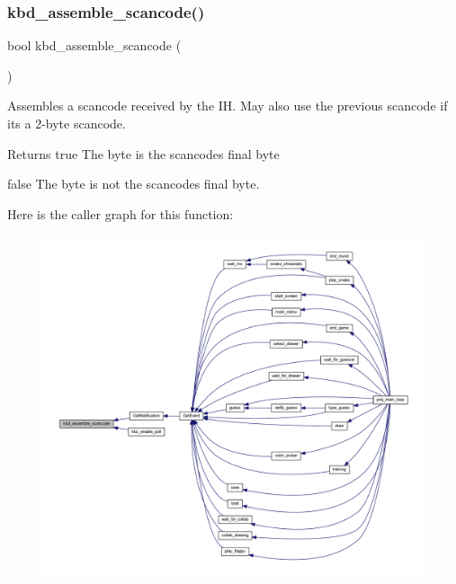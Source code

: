 \subsubsection{\texorpdfstring{kbd\+\_\+assemble\+\_\+scancode()}{kbd\_assemble\_scancode()}}
{\footnotesize\ttfamily bool kbd\+\_\+assemble\+\_\+scancode (\begin{DoxyParamCaption}{ }\end{DoxyParamCaption})}



Assembles a scancode received by the IH. May also use the previous scancode if it\textquotesingle{}s a 2-\/byte scancode. 

\begin{DoxyReturn}{Returns}
true The byte is the scancode\textquotesingle{}s final byte 

false The byte is not the scancode\textquotesingle{}s final byte. 
\end{DoxyReturn}
Here is the caller graph for this function\+:\nopagebreak
\begin{figure}[H]
\begin{center}
\leavevmode
\includegraphics[width=350pt]{group__keyboard_ga32e63cb280df583f193cbc065b0b327e_icgraph}
\end{center}
\end{figure}
\mbox{\label{group__keyboard_ga6d0b21990c1bc497f6986367d485af52}} 

